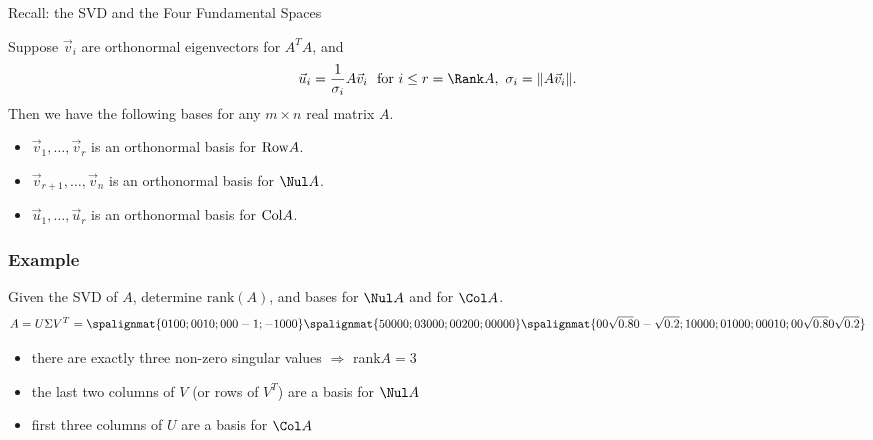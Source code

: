 \begin{frame}{Recall: the SVD and the Four Fundamental Spaces}

Suppose $\vec v_i$ are orthonormal eigenvectors for $A^TA$, and $$\vec u _i = \frac{1}{\sigma_i}A\vec v_ i \ \text{ for } i \le r = \Rank A, \ \sigma_i = \lVert A \vec v_i \rVert.$$ Then we have the following bases for any $m\times n$ real matrix $A$. 
\begin{itemize}

    \item<2->  $ \vec v_1 ,\dotsc, \vec v_r$ is an orthonormal basis for $ \textup{Row} A$. 
    
    \item<2->  $ \vec v_{r+1} ,\dotsc, \vec v_n$ is an orthonormal basis for $ \Nul  A $. 
    
    
    \item<3->  $ \vec u_1 ,\dotsc, \vec u_r$ is an orthonormal basis for $ \textup{Col} A$.  
    
\end{itemize}

\vspace{12pt}


\end{frame}


\begin{frame}\frametitle{Example}
    Given the SVD of $A$, determine $\text{rank}(A)$, and bases for $\Nul A$ and for $\Col A$.
    \begin{align*}
        A = U \Sigma V^T = \spalignmat{0 1 0 0;0 0 1 0;0 0 0 -1;-1 0 0 0} \spalignmat{5 0 0 0 0;0 3 0 0 0;0 0 2 0 0;0 0 0 0 0} \spalignmat{0 0 \sqrt{0.8} 0 -\sqrt{0.2}; 1 0 0 0 0;0 1 0 0 0;0 0 0 1 0;0 0 \sqrt{0.8} 0 \sqrt{0.2}}
    \end{align*}

    \begin{itemize}
        \item<3-> there are exactly three non-zero singular values $\Rightarrow$ rank$A = 3$
        \item<4-> the last two columns of $V$ (or rows of $V^T$) are a basis for $\Nul A$
        \item<5-> first three columns of $U$ are a basis for $\Col A$
    \end{itemize}

\end{frame}


